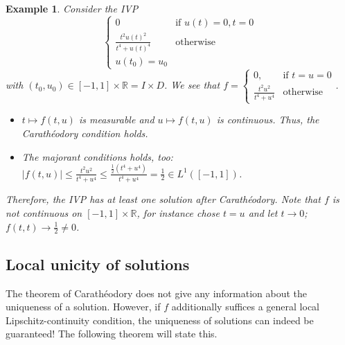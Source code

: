 \documentclass[a4paper, 11pt]{article}
\newtheorem*{example}{Example}
\begin{document}
\begin{example}
	Consider the IVP
	\[
	\begin{cases}
	0 \quad &\text{if $u(t) = 0, t= 0$} \\
	\frac{t^2u(t)^2}{t^4+u(t)^4} & \text{otherwise} \\
	u(t_0) = u_0
	\end{cases}
	\]
	with $(t_0,u_0) \in [-1,1] \times \mathbb R = I \times D$. We see that $f = \begin{cases}
	0, \quad & \text{if $t=u=0$} \\
	\frac{t^2u^2}{t^4+u^4} & \text{otherwise}
	\end{cases}$.
	\begin{itemize}
		\item $t \mapsto f(t,u)$ is measurable and $u \mapsto f(t,u)$ is continuous. Thus, the Carathéodory condition holds.
		
		\item The majorant conditions holds, too: $|f(t,u)| \leq \frac{t^2u^2}{t^4+u^4} \leq \frac{\frac{1}{2}(t^4+u^4)}{t^4+u^4} = \frac{1}{2} \in L^1([-1,1])$.
	\end{itemize}
	Therefore, the IVP has at least one solution after Carathéodory. Note that $f$ is not continuous on $[-1,1] \times \mathbb R$, for instance chose $t=u$ and let $t \to 0$; $f(t,t) \to \frac{1}{2} \neq 0$.
\end{example}



\subsection*{Local unicity of solutions}
The theorem of Carathéodory does not give any information about the uniqueness of a solution. However, if $f$ additionally suffices a general local Lipschitz-continuity condition, the uniqueness of solutions can indeed be guaranteed! The following theorem will state this.
\end{document}
